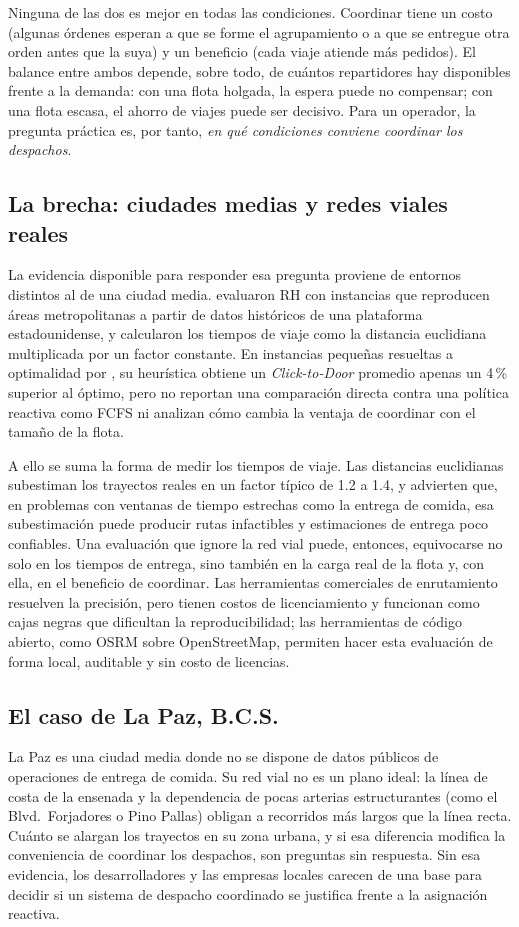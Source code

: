 \documentclass[12pt,letterpaper,oneside]{book}
\begin{document}
Ninguna de las dos es mejor en todas las condiciones.  Coordinar tiene un costo (algunas órdenes
esperan a que se forme el agrupamiento o a que se entregue otra orden antes que la suya) y un
beneficio (cada viaje atiende más pedidos).  El balance entre ambos depende, sobre todo, de
cuántos repartidores hay disponibles frente a la demanda: con una flota holgada, la espera puede
no compensar; con una flota escasa, el ahorro de viajes puede ser decisivo.  Para un operador, la
pregunta práctica es, por tanto, \emph{en qué condiciones conviene coordinar los despachos}.

\subsection{La brecha: ciudades medias y redes viales reales}
La evidencia disponible para responder esa pregunta proviene de entornos distintos al de una
ciudad media.  \citet{Reyes2018} evaluaron RH con instancias que reproducen áreas metropolitanas a
partir de datos históricos de una plataforma estadounidense, y calcularon los tiempos de viaje
como la distancia euclidiana multiplicada por un factor constante.  En instancias pequeñas
resueltas a optimalidad por \citet{Yildiz2019MealDelivery}, su heurística obtiene un \textit{Click-to-Door} promedio apenas un 4\,\%
superior al óptimo, pero no reportan una comparación directa contra una política reactiva como
FCFS ni analizan cómo cambia la ventaja de coordinar con el tamaño de la flota.

A ello se suma la forma de medir los tiempos de viaje.  Las distancias euclidianas subestiman los
trayectos reales en un factor típico de 1.2 a 1.4, y \citet{Boyaci2021} advierten que, en
problemas con ventanas de tiempo estrechas como la entrega de comida, esa subestimación puede
producir rutas infactibles y estimaciones de entrega poco confiables.  Una evaluación que ignore
la red vial puede, entonces, equivocarse no solo en los tiempos de entrega, sino también en la
carga real de la flota y, con ella, en el beneficio de coordinar.  Las herramientas comerciales de
enrutamiento resuelven la precisión, pero tienen costos de licenciamiento \citep{Pereira2021} y
funcionan como cajas negras que dificultan la reproducibilidad; las herramientas de código abierto,
como OSRM sobre OpenStreetMap, permiten hacer esta evaluación de forma local, auditable y sin
costo de licencias.

\subsection{El caso de La Paz, B.C.S.}
La Paz es una ciudad media donde no se dispone de datos públicos de operaciones de entrega de
comida.  Su red vial no es un plano ideal: la línea de costa de la ensenada y la dependencia de
pocas arterias estructurantes (como el Blvd.\ Forjadores o Pino Pallas) obligan a recorridos más
largos que la línea recta.  Cuánto se alargan los trayectos en su zona urbana, y si esa diferencia
modifica la conveniencia de coordinar los despachos, son preguntas sin respuesta.  Sin esa
evidencia, los desarrolladores y las empresas locales carecen de una base para decidir si un
sistema de despacho coordinado se justifica frente a la asignación reactiva.
\end{document}
